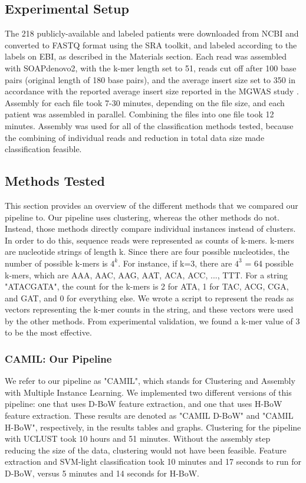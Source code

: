 
\subsection{Experimental Setup}

The 218 publicly-available and labeled patients were downloaded from NCBI and converted to FASTQ format using the SRA toolkit, and labeled according to the labels on EBI, as described in the Materials section. Each read was assembled with SOAPdenovo2, with the k-mer length set to 51, reads cut off after 100 base pairs (original length of 180 base pairs), and the average insert size set to 350 in accordance with the reported average insert size reported in the MGWAS study \cite{qin041012}. Assembly for each file took 7-30 minutes, depending on the file size, and each patient was assembled in parallel. Combining the files into one file took 12 minutes. Assembly was used for all of the classification methods tested, because the combining of individual reads and reduction in total data size made classification feasible.

\subsection{Methods Tested}

This section provides an overview of the different methods that we compared our pipeline to. Our pipeline uses clustering, whereas the other methods do not. Instead, those methods directly compare individual instances instead of clusters. In order to do this, sequence reads were represented as counts of k-mers. k-mers are nucleotide strings of length k. Since there are four possible nucleotides, the number of possible k-mers is \(4^k\). For instance, if k=3, there are \(4^3\) = 64 possible k-mers, which are AAA, AAC, AAG, AAT, ACA, ACC, ..., TTT. For a string "ATACGATA", the count for the k-mers is 2 for ATA, 1 for TAC, ACG, CGA, and GAT, and 0 for everything else. We wrote a script to represent the reads as vectors representing the k-mer counts in the string, and these vectors were used by the other methods. From experimental validation, we found a k-mer value of 3 to be the most effective.

\subsubsection{CAMIL: Our Pipeline}

We refer to our pipeline as "CAMIL", which stands for Clustering and Assembly with Multiple Instance Learning. We implemented two different versions of this pipeline: one that uses D-BoW feature extraction, and one that uses H-BoW feature extraction. These results are denoted as "CAMIL D-BoW" and "CAMIL H-BoW", respectively, in the results tables and graphs. Clustering for the pipeline with UCLUST took 10 hours and 51 minutes. Without the assembly step reducing the size of the data, clustering would not have been feasible. Feature extraction and SVM-light classification took 10 minutes and 17 seconds to run for D-BoW, versus 5 minutes and 14 seconds for H-BoW.

